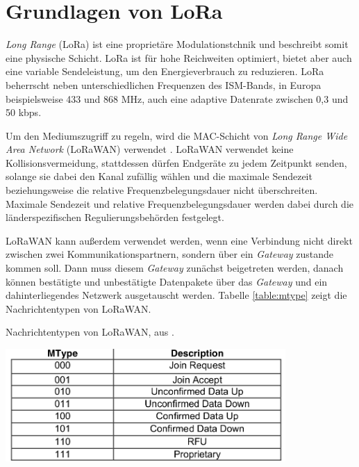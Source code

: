 \section{Grundlagen von LoRa}
\emph{Long Range} (LoRa) ist eine proprietäre Modulationstchnik und beschreibt somit eine physische Schicht.
LoRa ist für hohe Reichweiten optimiert, bietet aber auch eine variable Sendeleistung, um den Energieverbrauch zu reduzieren.
LoRa beherrscht neben unterschiedlichen Frequenzen des ISM-Bands, in Europa beispielsweise 433 und 868 MHz, auch eine adaptive Datenrate zwischen 0,3 und 50 kbps.

Um den Mediumszugriff zu regeln, wird die MAC-Schicht von \emph{Long Range Wide Area Network} (LoRaWAN) verwendet \cite{lora2015spec}.
LoRaWAN verwendet keine Kollisionsvermeidung, stattdessen dürfen Endgeräte zu jedem Zeitpunkt senden, solange sie dabei den Kanal zufällig wählen und die maximale Sendezeit beziehungsweise die relative Frequenzbelegungsdauer nicht überschreiten.
Maximale Sendezeit und relative Frequenzbelegungsdauer werden dabei durch die länderspezifischen Regulierungsbehörden festgelegt.

LoRaWAN kann außerdem verwendet werden, wenn eine Verbindung nicht direkt zwischen zwei Kommunikationspartnern, sondern über ein \emph{Gateway} zustande kommen soll.
Dann muss diesem \emph{Gateway} zunächst beigetreten werden, danach können bestätigte und unbestätigte Datenpakete über das \emph{Gateway} und ein dahinterliegendes Netzwerk ausgetauscht werden.
Tabelle \ref{table:mtype} zeigt die Nachrichtentypen von LoRaWAN.

\begin{table}[h]
  \centering
  \caption{Nachrichtentypen von LoRaWAN, aus \cite{lora2015spec}.}
	\includegraphics[width=0.8\textwidth]{images/mtype.png}
  \label{table:mtype}
\end{table}



